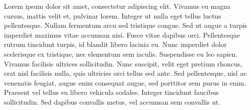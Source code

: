 Lorem ipsum dolor sit amet, consectetur adipiscing elit. Vivamus eu magna cursus, mattis velit et\cite{silva2013caracterizaccao}, pulvinar lorem. Integer ut nulla eget tellus luctus pellentesque. Nullam fermentum arcu sed tristique congue. Sed ut augue a turpis imperdiet maximus vitae accumsan nisi. Fusce vitae dapibus orci. Pellentesque rutrum tincidunt turpis, id blandit libero lacinia eu. Nunc imperdiet dolor scelerisque ex tristique, nec elementum sem iaculis. Suspendisse eu leo sapien. Vivamus facilisis ultrices sollicitudin. Nunc suscipit, velit eget pretium rhoncus, erat nisl facilisis nulla, quis ultricies orci tellus sed ante. Sed pellentesque, nisl ac venenatis feugiat, augue enim consequat augue, sed porttitor sem purus in enim. Praesent vel tellus eu libero vehicula sodales. Integer tincidunt faucibus sollicitudin. Sed dapibus convallis metus, vel accumsan sem convallis ut.








